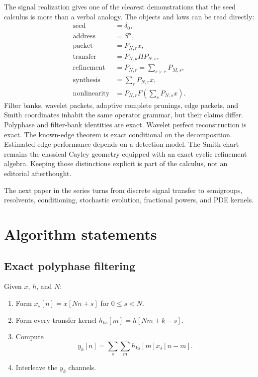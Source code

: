 \documentclass[11pt]{article}
\theoremstyle{definition}
\theoremstyle{remark}
\begin{document}
The signal realization gives one of the clearest demonstrations that the seed calculus is more than a verbal analogy. The objects and laws can be read directly:
\[
\boxed{
\begin{aligned}
\text{seed}&=\delta_0,\\
\text{address}&=S^n,\\
\text{packet}&=P_{N,r}x,\\
\text{transfer}&=P_{N,k}HP_{N,s},\\
\text{refinement}&=P_{N,r}=\sum_{s\succ r}P_{M,s},\\
\text{synthesis}&=\sum_rP_{N,r}x,\\
\text{nonlinearity}&=P_{N,r}F\left(\sum_sP_{N,s}x\right).
\end{aligned}
}
\]
Filter banks, wavelet packets, adaptive complete prunings, edge packets, and Smith coordinates inhabit the same operator grammar, but their claims differ. Polyphase and filter-bank identities are exact. Wavelet perfect reconstruction is exact. The known-edge theorem is exact conditional on the decomposition. Estimated-edge performance depends on a detection model. The Smith chart remains the classical Cayley geometry equipped with an exact cyclic refinement algebra. Keeping those distinctions explicit is part of the calculus, not an editorial afterthought.

The next paper in the series turns from discrete signal transfer to semigroups, resolvents, conditioning, stochastic evolution, fractional powers, and PDE kernels.

\appendix
\section{Algorithm statements}

\subsection{Exact polyphase filtering}

Given $x$, $h$, and $N$:

\begin{enumerate}
\item Form $x_s[n]=x[Nn+s]$ for $0\le s<N$.
\item Form every transfer kernel $h_{ks}[m]=h[Nm+k-s]$.
\item Compute
\[
y_k[n]=\sum_s\sum_mh_{ks}[m]x_s[n-m].
\]
\item Interleave the $y_k$ channels.
\end{enumerate}
\end{document}
